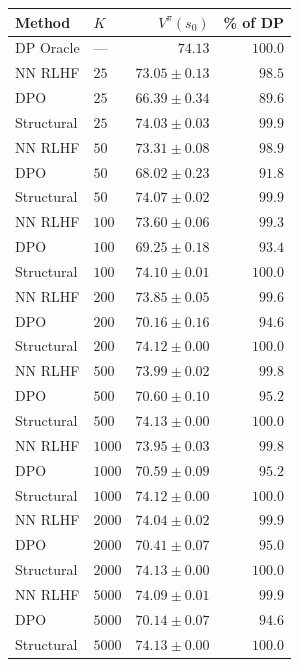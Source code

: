\begin{tabular}{llrr}
\hline
Method & $K$ & $V^\pi(s_0)$ & \% of DP \\
\hline
DP Oracle & --- & $74.13$ & $100.0$ \\
\hline
NN RLHF & $25$ & $73.05 \pm 0.13$ & $98.5$ \\
DPO & $25$ & $66.39 \pm 0.34$ & $89.6$ \\
Structural & $25$ & $74.03 \pm 0.03$ & $99.9$ \\
\hline
NN RLHF & $50$ & $73.31 \pm 0.08$ & $98.9$ \\
DPO & $50$ & $68.02 \pm 0.23$ & $91.8$ \\
Structural & $50$ & $74.07 \pm 0.02$ & $99.9$ \\
\hline
NN RLHF & $100$ & $73.60 \pm 0.06$ & $99.3$ \\
DPO & $100$ & $69.25 \pm 0.18$ & $93.4$ \\
Structural & $100$ & $74.10 \pm 0.01$ & $100.0$ \\
\hline
NN RLHF & $200$ & $73.85 \pm 0.05$ & $99.6$ \\
DPO & $200$ & $70.16 \pm 0.16$ & $94.6$ \\
Structural & $200$ & $74.12 \pm 0.00$ & $100.0$ \\
\hline
NN RLHF & $500$ & $73.99 \pm 0.02$ & $99.8$ \\
DPO & $500$ & $70.60 \pm 0.10$ & $95.2$ \\
Structural & $500$ & $74.13 \pm 0.00$ & $100.0$ \\
\hline
NN RLHF & $1000$ & $73.95 \pm 0.03$ & $99.8$ \\
DPO & $1000$ & $70.59 \pm 0.09$ & $95.2$ \\
Structural & $1000$ & $74.12 \pm 0.00$ & $100.0$ \\
\hline
NN RLHF & $2000$ & $74.04 \pm 0.02$ & $99.9$ \\
DPO & $2000$ & $70.41 \pm 0.07$ & $95.0$ \\
Structural & $2000$ & $74.13 \pm 0.00$ & $100.0$ \\
\hline
NN RLHF & $5000$ & $74.09 \pm 0.01$ & $99.9$ \\
DPO & $5000$ & $70.14 \pm 0.07$ & $94.6$ \\
Structural & $5000$ & $74.13 \pm 0.00$ & $100.0$ \\
\hline
\end{tabular}
